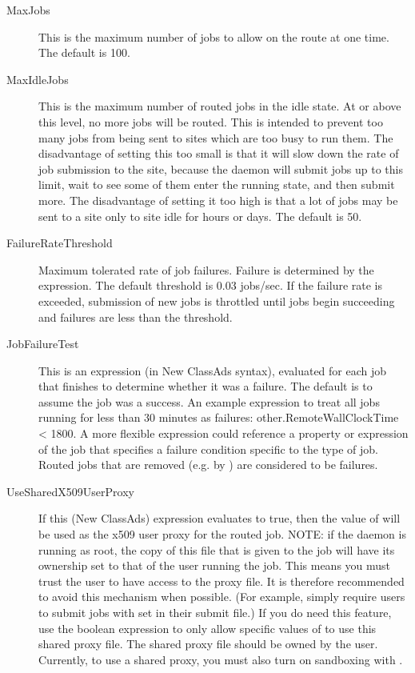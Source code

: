 \begin{description}
\begin{description}
\item[MaxJobs] This is the maximum number of jobs to allow on the route at
one time. The default is 100.

\item[MaxIdleJobs] This is the maximum number of routed jobs in the
idle state.  At or above this level, no more jobs will be routed.
This is intended to prevent too many jobs from being sent to sites
which are too busy to run them.  The disadvantage of setting this too
small is that it will slow down the rate of job submission to the
site, because the  daemon will submit jobs up to this limit, wait to see
some of them enter the running state, and then submit more.  The
disadvantage of setting it too high is that a lot of jobs may be sent
to a site only to site idle for hours or days.  The default is 50.

\item[FailureRateThreshold] Maximum tolerated rate of job failures.
Failure is determined by the  expression.  The
default threshold is 0.03 jobs/sec.  If the failure rate is exceeded,
submission of new jobs is throttled until jobs begin succeeding and
failures are less than the threshold.

\item[JobFailureTest] This is an expression (in New ClassAds syntax),
evaluated for each job that finishes to determine whether it was a
failure.  The default is to assume the job was a success.  An example
expression to treat all jobs running for less than 30 minutes as
failures: other.RemoteWallClockTime < 1800.  A more flexible
expression could reference a property or expression of the job that
specifies a failure condition specific to the type of job.  Routed
jobs that are removed (e.g. by ) are considered
to be failures.

\item[UseSharedX509UserProxy] If this (New ClassAds) expression
evaluates to true, then the value of  will
be used as the x509 user proxy for the routed job.  NOTE: if the  daemon
is running as root, the copy of this file that is given to the job
will have its ownership set to that of the user running the job.  This
means you must trust the user to have access to the proxy file.  It is
therefore recommended to avoid this mechanism when possible.  (For
example, simply require users to submit jobs with 
set in their submit file.)  If you do need this feature, use the
boolean expression to only allow specific values of 
to use this shared proxy file.  The shared proxy file should be owned
by the  user.  Currently, to use a shared proxy, you must also
turn on sandboxing with .


\end{description}
\end{description}
